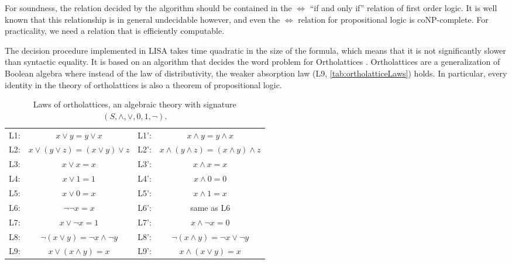 For soundness, the relation decided by the algorithm should be contained in the $\Longleftrightarrow$ ``if and only if'' relation of first order logic. It is well known that this relationship is in general undecidable however, and even the $\Longleftrightarrow$ relation for propositional logic is coNP-complete. For practicality, we need a relation that is efficiently computable.

The decision procedure implemented in LISA takes time quadratic in the size of the formula, which means that it is not significantly slower than syntactic equality.
It is based on an algorithm that decides the word problem for Ortholattices \cite{guilloudFormulaNormalizationsVerification2023a}.
Ortholattices are a generalization of Boolean algebra where instead of the law of distributivity, the weaker absorption law (L9, \autoref{tab:ortholatticeLaws}) holds. In particular, every identity in the theory of ortholattices is also a theorem of propositional logic.
\begin{table}[bth]
  \centering
  \begin{tabular}{r c @{\hskip 2em} | @{\hskip 2em} r c}
    L1: & $x \lor y = y \lor x$                    & L1': & $x \land y = y \land x$                      \\
    L2: & $x \lor ( y \lor z) = (x \lor y) \lor z$ & L2': & $x \land ( y \land z) = (x \land y) \land z$ \\
    L3: & $x \lor x = x$                           & L3': & $x \land x = x$                              \\
    L4: & $x \lor 1 = 1$                           & L4': & $x \land 0 = 0$                              \\
    L5: & $x \lor 0 = x$                           & L5': & $x \land 1 = x$                              \\
    L6: & $\neg \neg x = x$                        & L6': & same as L6                                   \\
    L7: & $x \lor \neg x = 1$                      & L7': & $x \land \neg x = 0$                         \\
    L8: & $\neg (x \lor y) = \neg x \land \neg y$  & L8': & $\neg (x \land y) = \neg x \lor \neg y$      \\
    L9: & $x \lor (x \land y) = x$                 & L9': & $x \land (x \lor y) = x$                     \\
  \end{tabular}
  \caption{Laws of ortholattices, an algebraic theory with signature $(S, \land, \lor, 0, 1, \neg)$.}
  \label{tab:ortholatticeLaws} 
\end{table}

